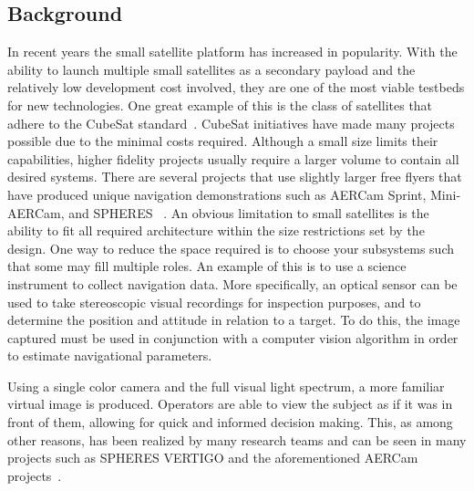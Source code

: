 \documentclass[journal, 10pt]{IEEEtran}
\begin{document}
\subsection{Background}
In recent years the small satellite platform has increased in popularity. With the ability to launch multiple small satellites as a secondary payload and the relatively low development cost involved, they are one of the most viable testbeds for new technologies.  One great example of this is the class of satellites that adhere to the CubeSat standard~\cite{CubeSat}.   CubeSat initiatives have made many projects possible due to the minimal costs required.  Although a small size limits their capabilities, higher fidelity projects usually require a larger volume to contain all desired systems.  There are several projects that use slightly larger free flyers that have produced unique navigation demonstrations such as AERCam Sprint, Mini-AERCam, and SPHERES ~\cite{Aercam, MiniAercam, SPHERES}. An obvious limitation to small satellites is the ability to fit all required architecture within the size restrictions set by the design.  One way to reduce the space required is to choose your subsystems such that some may fill multiple roles.  An example of this is to use a science instrument to collect navigation data.  More specifically, an optical sensor can be used to take stereoscopic visual recordings for inspection purposes, and to determine the position and attitude in relation to a target.  To do this, the image captured must be used in conjunction with a computer vision algorithm in order to estimate navigational parameters.

Using a single color camera and the full visual light spectrum, a more familiar virtual image is produced.  Operators are able to view the subject as if it was in front of them, allowing for quick and informed decision making.  This, as among other reasons, has been realized by many research teams and can be seen in many projects such as SPHERES VERTIGO and the aforementioned AERCam projects~\cite{Aercam,MiniAercam, Vertigo1}.
\end{document}
